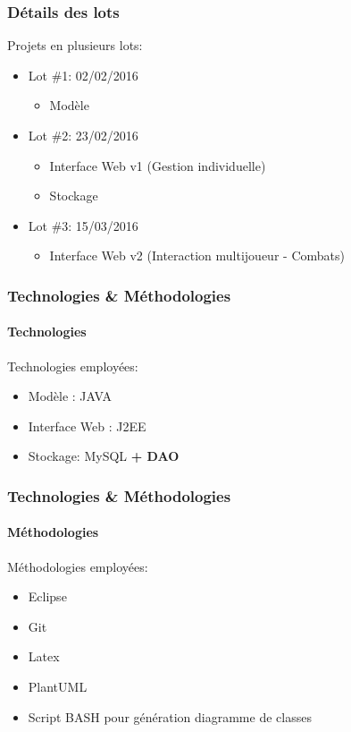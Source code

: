 \documentclass[aspectratio=169]{beamer}
\begin{document}
    \begin{frame}
        \frametitle{D\'etails des lots}
        Projets en plusieurs lots:
        \begin{itemize}
            \item Lot \#1: 02/02/2016\\
                \begin{itemize}
                    \item Modèle
                \end{itemize}
            \item Lot \#2: 23/02/2016
                \begin{itemize}
                    \item Interface Web v1 (Gestion individuelle)
                    \item Stockage
                \end{itemize}
            \item Lot \#3: 15/03/2016
                \begin{itemize}
                    \item Interface Web v2 (Interaction multijoueur - Combats)
                \end{itemize}
        \end{itemize}
    \end{frame}

    \begin{frame}
        \frametitle{Technologies \& Méthodologies}
        \framesubtitle{Technologies}
        Technologies employées:
        \begin{itemize}
            \item Modèle : JAVA
            \item Interface Web : J2EE
            \item Stockage: MySQL \textbf{+ DAO}
        \end{itemize}
    \end{frame}
    \begin{frame}
        \frametitle{Technologies \& Méthodologies}
        \framesubtitle{Méthodologies}
        Méthodologies employées:
        \begin{itemize}
            \item Eclipse
            \item Git
            \item Latex
            \item PlantUML
            \item Script BASH pour génération diagramme de classes
        \end{itemize}
    \end{frame}
\end{document}
